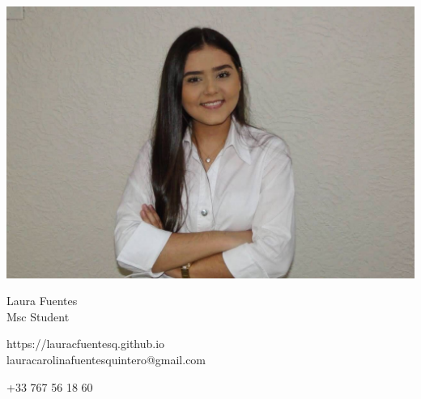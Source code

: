 \documentclass{article}
\begin{document}
\centering \includegraphics[width=.25\linewidth]{logo}\\[5pt]
\parbox{2in}{\Large \centering Laura Fuentes\\[1pt]
\normalsize Msc Student}

\vfill
\raggedright
\begin{multicols}{2}
https://lauracfuentesq.github.io\\
lauracarolinafuentesquintero@gmail.com

\columnbreak
\raggedleft
+33 767 56 18 60%
\end{multicols}%
\end{document}
